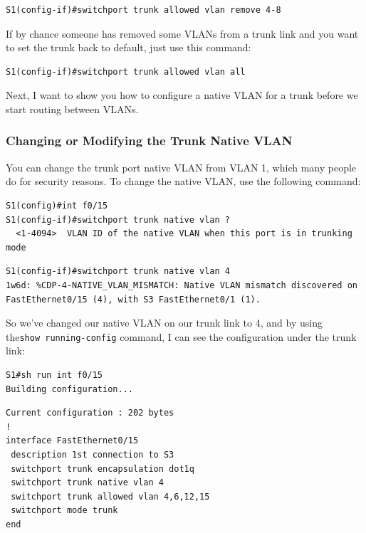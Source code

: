 \begin{verbatim}
S1(config-if)#switchport trunk allowed vlan remove 4-8
\end{verbatim}

If by chance someone has removed some VLANs from a trunk link and you
want to set the trunk back to default, just use this command:

\begin{verbatim}
S1(config-if)#switchport trunk allowed vlan all
\end{verbatim}

Next, I want to show you how to configure a native VLAN for a trunk
before we start routing between VLANs.

\subsubsection[Changing or Modifying the Trunk Native
VLAN]{\texorpdfstring{\protect\hypertarget{c11.xhtmlux5cux23c11-sec-13}{}{}Changing
or Modifying the Trunk Native
VLAN}{Changing or Modifying the Trunk Native VLAN}}

You can change the trunk port native VLAN from VLAN 1, which many people
do for security reasons. To change the native VLAN, use the following
command:

\begin{verbatim}
S1(config)#int f0/15
S1(config-if)#switchport trunk native vlan ?
  <1-4094>  VLAN ID of the native VLAN when this port is in trunking mode
\end{verbatim}

\begin{verbatim}
S1(config-if)#switchport trunk native vlan 4
1w6d: %CDP-4-NATIVE_VLAN_MISMATCH: Native VLAN mismatch discovered on FastEthernet0/15 (4), with S3 FastEthernet0/1 (1).
\end{verbatim}

So we've changed our native VLAN on our trunk link to 4, and by using
the\texttt{show\ running-config} command, I can see the configuration
under the trunk link:

\begin{verbatim}
S1#sh run int f0/15
Building configuration...
\end{verbatim}

\begin{verbatim}
Current configuration : 202 bytes
!
interface FastEthernet0/15
 description 1st connection to S3
 switchport trunk encapsulation dot1q
 switchport trunk native vlan 4
 switchport trunk allowed vlan 4,6,12,15
 switchport mode trunk
end
\end{verbatim}

